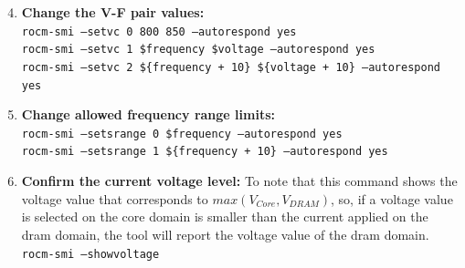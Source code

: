 \begin{enumerate}
\setcounter{enumi}{3}
\item \textbf{Change the V-F pair values:} \\
\texttt{rocm-smi --setvc 0 800 850  --autorespond yes}\\
\texttt{rocm-smi --setvc 1 \$frequency \$voltage     --autorespond yes}\\
\texttt{rocm-smi --setvc 2 \$\{frequency + 10\} \$\{voltage + 10\}  --autorespond yes}
\item \textbf{Change allowed frequency range limits:} \\
\texttt{rocm-smi --setsrange 0 \$frequency --autorespond yes}\\
\texttt{rocm-smi --setsrange 1 \$\{frequency + 10\} --autorespond yes}
\item \textbf{Confirm the current voltage level:} To note that this command shows the voltage value that corresponds to $max(V_{Core}, V_{DRAM})$, so, if a voltage value is selected on the core domain is smaller than the current applied on the \acrshort{dram} domain, the tool will report the voltage value of the \acrshort{dram} domain.\\
\texttt{rocm-smi --showvoltage}
\end{enumerate}

